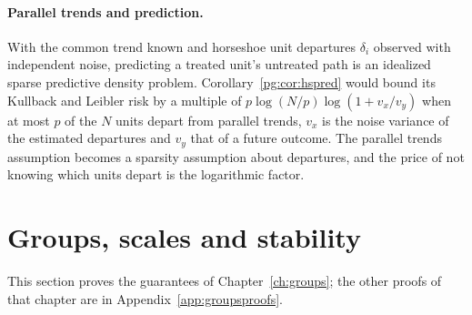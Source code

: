 \paragraph{Parallel trends and prediction.} With the common trend known and horseshoe unit departures $\delta_i$ observed with independent noise, predicting a treated unit's untreated path is an idealized sparse predictive density problem. Corollary~\ref{pg:cor:hspred} would bound its Kullback and Leibler risk by a multiple of $p\log(N/p)\log(1+v_x/v_y)$ when at most $p$ of the $N$ units depart from parallel trends, $v_x$ is the noise variance of the estimated departures and $v_y$ that of a future outcome. The parallel trends assumption becomes a sparsity assumption about departures, and the price of not knowing which units depart is the logarithmic factor.

\section{Groups, scales and stability}\label{pg:sec:groups}

This section proves the guarantees of Chapter~\ref{ch:groups}; the other proofs of that chapter are in Appendix~\ref{app:groupsproofs}.

